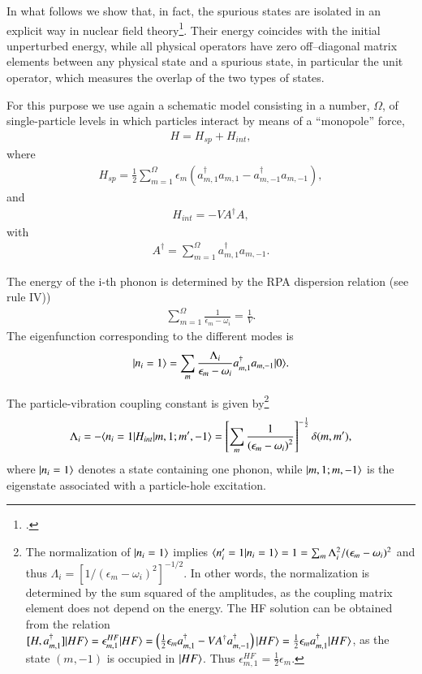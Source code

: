 In what follows we show that, in fact, the spurious states are isolated in an
explicit way in  nuclear field theory\footnote{\cite{Broglia:76}.}. Their energy coincides with the
initial unperturbed  energy, while all physical operators have zero off--diagonal
matrix elements between any physical state and a spurious state, in particular
the unit operator, which measures the overlap of the two types of states.


For this purpose we use again a schematic model consisting in a number, $\Omega$,
of single-particle levels in which particles interact by means of a ``monopole''
force,
 \begin{align}\label{eqC1A46} 
H=H_{sp}+H_{int},
 \end{align}
where
 \begin{align}\label{eqC1A47} 
H_{sp}=\frac{1}{2}\sum_{m=1}^\Omega\epsilon_m\left(a^\dagger_{m,1}a_{m,1}-a^\dagger_{m,-1}a_{m,-1}\right),
 \end{align}
and
 \begin{align}\label{eqC1A48} 
H_{int}=-VA^\dagger A,
 \end{align}
with
 \begin{align}\label{eqC1A49} 
 A^\dagger=\sum_{m=1}^\Omega a^\dagger_{m,1}a_{m,-1}.
 \end{align}

The energy of the i-th phonon is determined by the RPA dispersion relation (see rule IV)) 
 \begin{align}\label{eqC1A50} 
\sum_{m=1}^{\Omega}\frac{1}{\epsilon_m-\omega_i}=\frac{1}{V}.
 \end{align}
The eigenfunction corresponding to the different modes is 
 \begin{align}\label{eqC1A51} 
|{n_i=1} \rangle=\sum_m\frac{\Lambda_i}{\epsilon_m-\omega_i}a^\dagger_{m,1}a_{m,-1}|{0} \rangle.
 \end{align}


The particle-vibration coupling constant is given by\footnote{The normalization of $|{n_i=1} \rangle$ implies $\langle {n'_i=1|n_i=1} \rangle=1=\sum_m\Lambda_i^2/(\epsilon_m-\omega_i)^2$ and thus $\Lambda_i=[1/(\epsilon_m-\omega_i)^2]^{-1/2}$. In other words, the normalization is determined by the sum squared of the amplitudes, as the coupling matrix element does not depend on the energy. The HF solution can be obtained from the relation $[H,a^\dagger_{m,1}]|{HF} \rangle=\epsilon_{m,1}^{HF}|{HF} \rangle=\left(\tfrac{1}{2}\epsilon_{m}a^\dagger_{m,1}-VA^\dagger a^\dagger_{m,-1}\right)|{HF} \rangle=\tfrac{1}{2}\epsilon_m a^\dagger_{m,1}|{HF} \rangle$, as the state $(m,-1)$ is occupied in $|{HF} \rangle$. Thus $\epsilon_{m,1}^{HF}=\tfrac{1}{2}\epsilon_m$.} 
 \begin{align}\label{eqC1A52} 
\Lambda_i=-\langle {n_i=1|H_{int}|m,1;m',-1} \rangle=\left[\sum_m\frac{1}{\left(\epsilon_m-\omega_i\right)^2}\right]^{-\frac{1}{2}}\delta(m,m'),
 \end{align} 
where $|{n_i=1} \rangle$ denotes a state containing one phonon, while $|{m,1;m,-1} \rangle$ is the eigenstate associated with a particle-hole excitation. 


